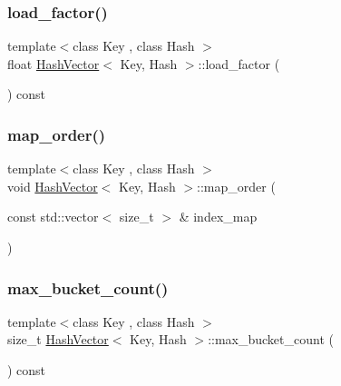 \mbox{\label{class_hash_vector_a440d2b40184d79fd3e24fdb31137c3b9}} 
\subsubsection{\texorpdfstring{load\+\_\+factor()}{load\_factor()}}
{\footnotesize\ttfamily template$<$class Key , class Hash $>$ \\
float \mbox{\hyperlink{class_hash_vector}{Hash\+Vector}}$<$ Key, Hash $>$\+::load\+\_\+factor (\begin{DoxyParamCaption}{ }\end{DoxyParamCaption}) const}

\mbox{\label{class_hash_vector_a0ad83187e532c5ae897ba8d4edcdd2bc}} 
\subsubsection{\texorpdfstring{map\+\_\+order()}{map\_order()}}
{\footnotesize\ttfamily template$<$class Key , class Hash $>$ \\
void \mbox{\hyperlink{class_hash_vector}{Hash\+Vector}}$<$ Key, Hash $>$\+::map\+\_\+order (\begin{DoxyParamCaption}\item[{const std\+::vector$<$ size\+\_\+t $>$ \&}]{index\+\_\+map }\end{DoxyParamCaption})}

\mbox{\label{class_hash_vector_a6f77df9d2a526c3c025870e9c507a685}} 
\subsubsection{\texorpdfstring{max\+\_\+bucket\+\_\+count()}{max\_bucket\_count()}}
{\footnotesize\ttfamily template$<$class Key , class Hash $>$ \\
size\+\_\+t \mbox{\hyperlink{class_hash_vector}{Hash\+Vector}}$<$ Key, Hash $>$\+::max\+\_\+bucket\+\_\+count (\begin{DoxyParamCaption}{ }\end{DoxyParamCaption}) const}

